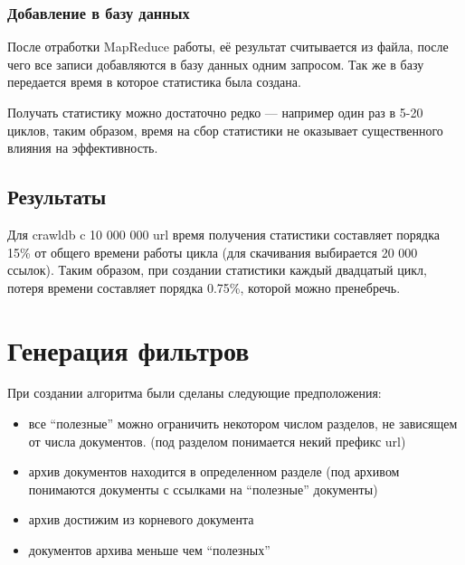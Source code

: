 \subsubsection{Добавление в базу данных}
После отработки MapReduce работы, её результат считывается из файла, после чего все записи добавляются в базу данных одним запросом. Так же в базу передается время в которое статистика была создана.

Получать статистику можно достаточно редко --- например один раз в 5-20 циклов, таким образом, время на сбор статистики не оказывает существенного влияния на эффективность.
\subsection{Результаты}
Для crawldb c 10 000 000 url время получения статистики составляет порядка 15\% от общего времени работы цикла (для скачивания выбирается 20 000 ссылок). Таким образом, при создании статистики каждый двадцатый цикл, потеря времени составляет порядка 0.75\%, которой  можно пренебречь.

\section{Генерация фильтров}
При создании алгоритма были сделаны следующие предположения:
\begin{itemize}
 \item все ``полезные'' можно ограничить некотором числом разделов, не зависящем от числа документов. (под разделом понимается некий префикс url)
 \item архив документов находится в определенном разделе (под архивом понимаются документы с ссылками на ``полезные'' документы)
 \item архив достижим из корневого документа
 \item документов архива меньше чем ``полезных''
\end{itemize}

